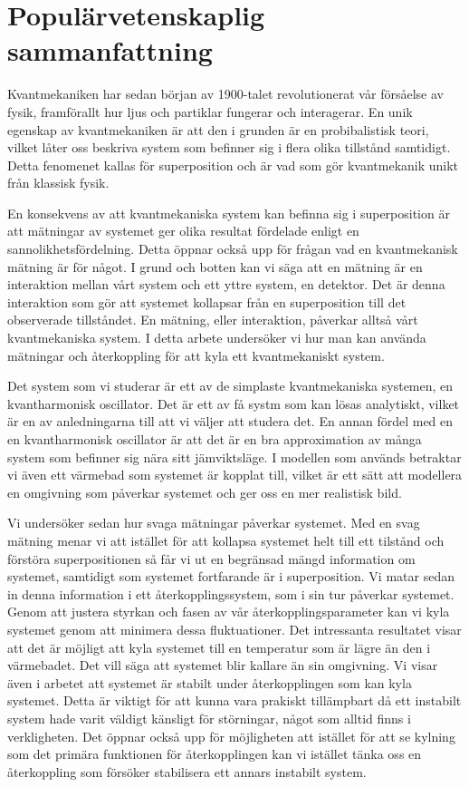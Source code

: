\section*{Populärvetenskaplig sammanfattning}
Kvantmekaniken har sedan början av 1900-talet revolutionerat vår försåelse av fysik, framförallt hur ljus och partiklar fungerar och interagerar. En unik egenskap av kvantmekaniken är att den i grunden är en probibalistisk teori, vilket låter oss beskriva system som befinner sig i flera olika tillstånd samtidigt. Detta fenomenet kallas för superposition och är vad som gör kvantmekanik unikt från klassisk fysik. 

En konsekvens av att kvantmekaniska system kan befinna sig i superposition är att mätningar av systemet ger olika resultat fördelade enligt en sannolikhetsfördelning. Detta öppnar också upp för frågan vad en kvantmekanisk mätning är för något. I grund och botten kan vi säga att en mätning är en interaktion mellan vårt system och ett yttre system, en detektor. Det är denna interaktion som gör att systemet kollapsar från en superposition till det observerade tillståndet. En mätning, eller interaktion, påverkar alltså vårt kvantmekaniska system. I detta arbete undersöker vi hur man kan använda mätningar och återkoppling för att kyla ett kvantmekaniskt system.

Det system som vi studerar är ett av de simplaste kvantmekaniska systemen, en kvantharmonisk oscillator. Det är ett av få systm som kan lösas analytiskt, vilket är en av anledningarna till att vi väljer att studera det. En annan fördel med en en kvantharmonisk oscillator är att det är en bra approximation av många system som befinner sig nära sitt jämviktsläge. I modellen som används betraktar vi även ett värmebad som systemet är kopplat till, vilket är ett sätt att modellera en omgivning som påverkar systemet och ger oss en mer realistisk bild.

Vi undersöker sedan hur svaga mätningar påverkar systemet. Med en svag mätning menar vi att istället för att kollapsa systemet helt till ett tilstånd och förstöra superpositionen så får vi ut en begränsad mängd information om systemet, samtidigt som systemet fortfarande är i superposition. Vi matar sedan in denna information i ett återkopplingssystem, som i sin tur påverkar systemet. Genom att justera styrkan och fasen av vår återkopplingsparameter kan vi kyla systemet genom att minimera dessa fluktuationer. Det intressanta resultatet visar att det är möjligt att kyla systemet till en temperatur som är lägre än den i värmebadet. Det vill säga att systemet blir kallare än sin omgivning. Vi visar även i arbetet att systemet är stabilt under återkopplingen som kan kyla systemet. Detta är viktigt för att kunna vara prakiskt tillämpbart då ett instabilt system hade varit väldigt känsligt för störningar, något som alltid finns i verkligheten. Det öppnar också upp för möjligheten att istället för att se kylning som det primära funktionen för återkopplingen kan vi istället tänka oss en återkoppling som försöker stabilisera ett annars instabilt system.

